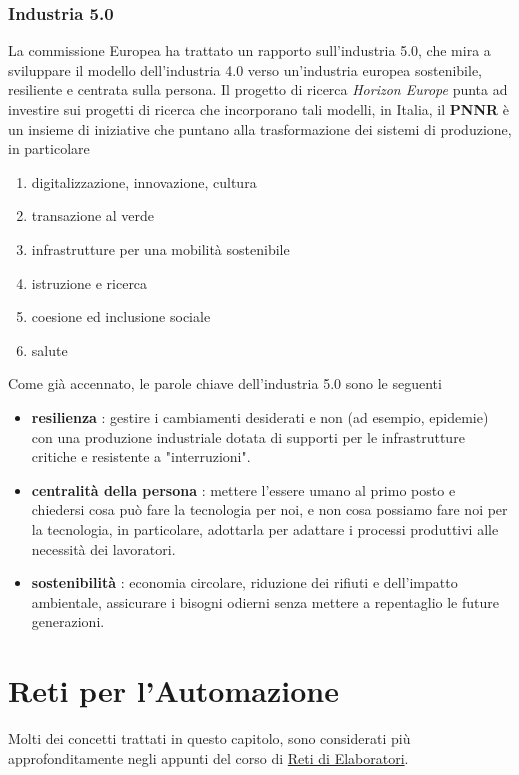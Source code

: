 \documentclass[10pt, letterpaper]{report}
\begin{document}
\subsection{Industria 5.0}
La commissione Europea ha trattato un rapporto sull'industria 5.0, che mira a sviluppare  il modello dell'industria 
4.0 verso un'industria europea sostenibile, resiliente e centrata sulla persona. Il progetto di 
ricerca \textit{Horizon Europe} punta ad investire sui progetti di ricerca che incorporano tali modelli, in Italia, 
il \textbf{PNNR} è un insieme di iniziative che puntano alla trasformazione dei sistemi di produzione, in particolare\begin{enumerate}
    \item digitalizzazione, innovazione, cultura 
    \item transazione al verde 
    \item infrastrutture per una mobilità sostenibile 
    \item istruzione e ricerca 
    \item coesione ed inclusione sociale 
    \item salute
\end{enumerate}
Come già accennato, le parole chiave dell'industria 5.0 sono le seguenti\begin{itemize}
    \item \textbf{resilienza} : gestire i cambiamenti desiderati e non (ad esempio, epidemie) con una 
    produzione  industriale
    dotata di supporti per le
    infrastrutture critiche e
    resistente a "interruzioni".
    \item \textbf{centralità della persona} : mettere l'essere umano al primo posto e chiedersi cosa 
    può fare la tecnologia per noi, e non cosa possiamo fare noi per la tecnologia, in particolare, adottarla 
    per adattare i processi produttivi alle necessità dei lavoratori.
    \item \textbf{sostenibilità} : economia circolare, riduzione dei rifiuti e dell'impatto ambientale, assicurare 
    i bisogni odierni senza mettere
    a repentaglio le future
    generazioni.
\end{itemize}



\chapter{Reti per l'Automazione}
Molti dei concetti trattati in questo capitolo, sono considerati più approfonditamente negli appunti del 
corso di 
\color{blue}\href{https://github.com/CasuFrost/University_notes/blob/main/Secondo%20Anno/Secondo%20Semestre/Reti%20di%20Elaboratori/Latex%20source%20file/Reti%20di%20Elaboratori.pdf}{Reti di Elaboratori}\color{black}.
\end{document}
